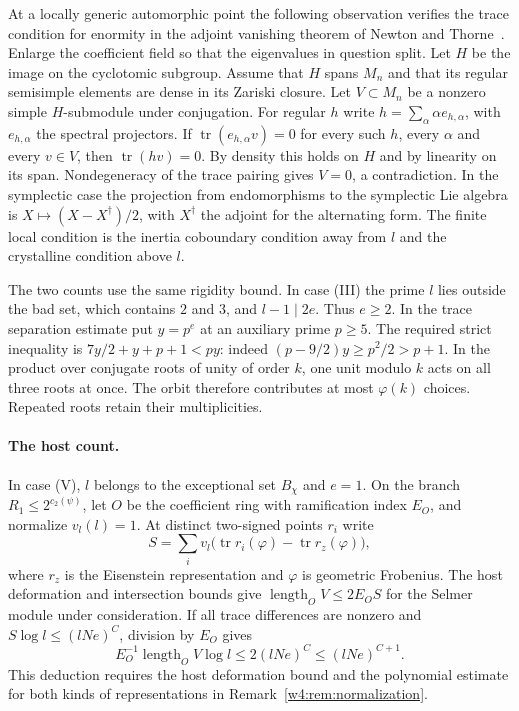 At a locally generic automorphic point the following observation verifies
the trace condition for enormity in the adjoint vanishing theorem
of Newton and Thorne~\cite{nt23}. Enlarge the coefficient field so that
the eigenvalues in question split. Let $H$ be the image on the cyclotomic
subgroup. Assume that $H$ spans $M_n$ and that its regular semisimple
elements are dense in its Zariski closure. Let $V\subset M_n$ be a nonzero
simple $H$-submodule under conjugation. For regular $h$ write
$h=\sum_\alpha\alpha e_{h,\alpha}$, with $e_{h,\alpha}$ the spectral
projectors. If $\operatorname{tr}(e_{h,\alpha}v)=0$ for every such $h$,
every $\alpha$ and every $v\in V$, then $\operatorname{tr}(hv)=0$.
By density this holds on $H$ and by linearity on its span. Nondegeneracy
of the trace pairing gives $V=0$, a contradiction. In the symplectic
case the projection from endomorphisms to the symplectic Lie algebra is
$X\mapsto(X-X^\dagger)/2$, with $X^\dagger$ the adjoint for the alternating
form. The finite local condition is the inertia coboundary condition away
from $l$ and the crystalline condition above $l$.

The two counts use the same rigidity bound. In case (III) the prime
$l$ lies outside the bad set, which contains $2$ and $3$, and $l-1\mid 2e$.
Thus $e\ge2$. In the trace separation estimate put $y=p^e$ at an auxiliary
prime $p\ge5$. The required strict inequality is
$7y/2+y+p+1<py$: indeed $(p-9/2)y\ge p^2/2>p+1$.
In the product over conjugate roots of unity of order $k$, one unit
modulo $k$ acts on all three roots at once. The orbit therefore contributes
at most $\varphi(k)$ choices. Repeated roots retain their multiplicities.

\paragraph{The host count.}
In case (V), $l$ belongs to the exceptional set $B_\chi$ and $e=1$. On the branch $R_1\le 2^{c_2(\psi)}$, let $O$ be the coefficient ring with ramification index $E_O$, and normalize $v_l(l)=1$. At distinct two-signed points $r_i$ write
\[
 S=\sum_i v_l\bigl(\operatorname{tr}r_i(\varphi)-\operatorname{tr}r_z(\varphi)\bigr),
\]
where $r_z$ is the Eisenstein representation and $\varphi$ is geometric Frobenius. The host deformation and intersection bounds give $\operatorname{length}_O V\le 2E_OS$ for the Selmer module under consideration. If all trace differences are nonzero and $S\log l\le (lNe)^C$, division by $E_O$ gives
\[
 E_O^{-1}\operatorname{length}_O V\log l\le 2(lNe)^C\le(lNe)^{C+1}.
\]
This deduction requires the host deformation bound and the polynomial estimate for both kinds of representations in Remark~\ref{w4:rem:normalization}.


